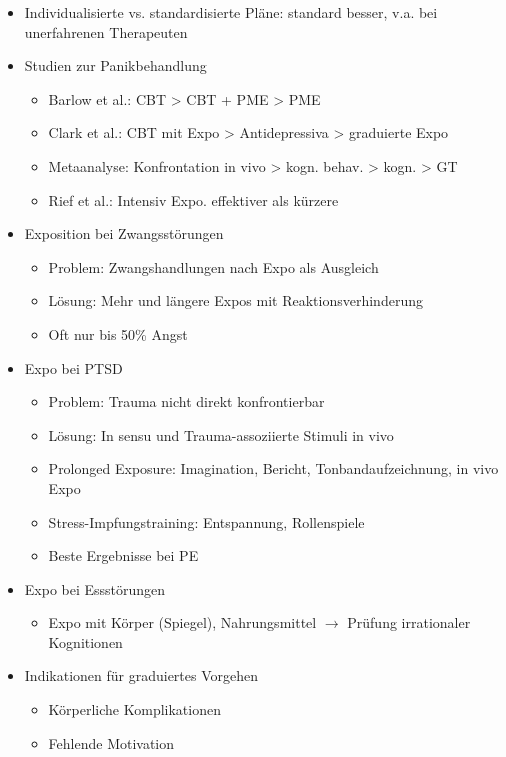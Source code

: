 \documentclass[11pt, paper=a4, twocolumn]{scrartcl}
\begin{document}
\begin{itemize}
			\item Individualisierte vs. standardisierte Pläne: standard besser, v.a. bei unerfahrenen Therapeuten
			\item Studien zur Panikbehandlung
				\begin{itemize}
					\item Barlow et al.: CBT > CBT + PME > PME
					\item Clark et al.: CBT mit Expo > Antidepressiva > graduierte Expo
					\item Metaanalyse: Konfrontation in vivo > kogn. behav. > kogn. > GT
					\item Rief et al.: Intensiv Expo. effektiver als kürzere
				\end{itemize}
			\item Exposition bei Zwangsstörungen
				\begin{itemize}
					\item Problem: Zwangshandlungen nach Expo als Ausgleich
					\item Lösung: Mehr und längere Expos mit Reaktionsverhinderung
					\item Oft nur bis 50\% Angst
				\end{itemize}
			\item Expo bei PTSD
				\begin{itemize}
					\item Problem: Trauma nicht direkt konfrontierbar
					\item Lösung: In sensu und Trauma-assoziierte Stimuli in vivo
					\item Prolonged Exposure: Imagination, Bericht, Tonbandaufzeichnung, in vivo Expo
					\item Stress-Impfungstraining: Entspannung, Rollenspiele
					\item Beste Ergebnisse bei PE
				\end{itemize}
			\item Expo bei Essstörungen
				\begin{itemize}
					\item Expo mit Körper (Spiegel), Nahrungsmittel $\rightarrow$ Prüfung irrationaler Kognitionen
				\end{itemize}
			\item Indikationen für graduiertes Vorgehen
				\begin{itemize}
					\item Körperliche Komplikationen
					\item Fehlende Motivation
				\end{itemize}
		\end{itemize}
\end{document}
